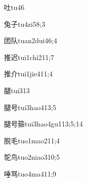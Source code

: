 \begin{verbete}{吐}{tu4}{6}
\end{verbete}

\begin{verbete}{兔子}{tu4zi5}{8;3}
\end{verbete}

\begin{verbete}{团队}{tuan2dui4}{6;4}
\end{verbete}

\begin{verbete}{推迟}{tui1chi2}{11;7}
\end{verbete}

\begin{verbete}{推介}{tui1jie4}{11;4}
\end{verbete}

\begin{verbete}{腿}{tui3}{13}
\end{verbete}

\begin{verbete}{腿号}{tui3hao4}{13;5}
\end{verbete}

\begin{verbete}{腿号箍}{tui3hao4gu1}{13;5;14}
\end{verbete}

\begin{verbete}{脱毛}{tuo1mao2}{11;4}
\end{verbete}

\begin{verbete}{鸵鸟}{tuo2niao3}{10;5}
\end{verbete}

\begin{verbete}{唾骂}{tuo4ma4}{11;9}
\end{verbete}

